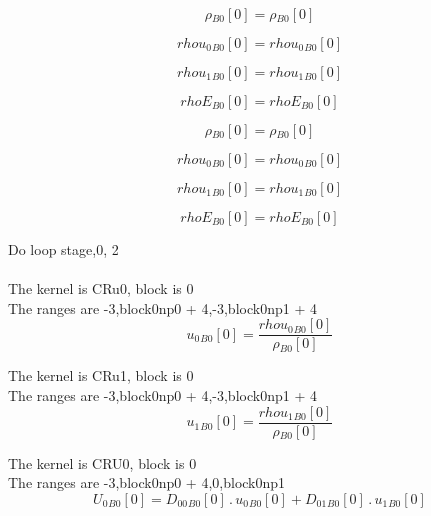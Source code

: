 \documentclass{article}
\begin{document}
\begin{dmath}{\rho{_{B0}}}[{0}] = {\rho{_{B0}}}[{0}]\end{dmath}

\begin{dmath}{rhou_{0}{_{B0}}}[{0}] = {rhou_{0}{_{B0}}}[{0}]\end{dmath}

\begin{dmath}{rhou_{1}{_{B0}}}[{0}] = {rhou_{1}{_{B0}}}[{0}]\end{dmath}

\begin{dmath}{rhoE{_{B0}}}[{0}] = {rhoE{_{B0}}}[{0}]\end{dmath}

\begin{dmath}{\rho{_{B0}}}[{0}] = {\rho{_{B0}}}[{0}]\end{dmath}

\begin{dmath}{rhou_{0}{_{B0}}}[{0}] = {rhou_{0}{_{B0}}}[{0}]\end{dmath}

\begin{dmath}{rhou_{1}{_{B0}}}[{0}] = {rhou_{1}{_{B0}}}[{0}]\end{dmath}

\begin{dmath}{rhoE{_{B0}}}[{0}] = {rhoE{_{B0}}}[{0}]\end{dmath}

\noindent Do loop stage,0, 2\\
\\\noindent The kernel is CRu0, block is 0\\\noindent The ranges are -3,block0np0 + 4,-3,block0np1 + 4\\\begin{dmath}{u_{0}{_{B0}}}[{0}] = \frac{{rhou_{0}{_{B0}}}[{0}]}{{\rho{_{B0}}}[{0}]}\end{dmath}

\noindent The kernel is CRu1, block is 0\\\noindent The ranges are -3,block0np0 + 4,-3,block0np1 + 4\\\begin{dmath}{u_{1}{_{B0}}}[{0}] = \frac{{rhou_{1}{_{B0}}}[{0}]}{{\rho{_{B0}}}[{0}]}\end{dmath}

\noindent The kernel is CRU0, block is 0\\\noindent The ranges are -3,block0np0 + 4,0,block0np1\\\begin{dmath}{U_{0}{_{B0}}}[{0}] = {D_{00}{_{B0}}}[{0}] \,.\, {u_{0}{_{B0}}}[{0}] + {D_{01}{_{B0}}}[{0}] \,.\, {u_{1}{_{B0}}}[{0}]\end{dmath}
\end{document}
